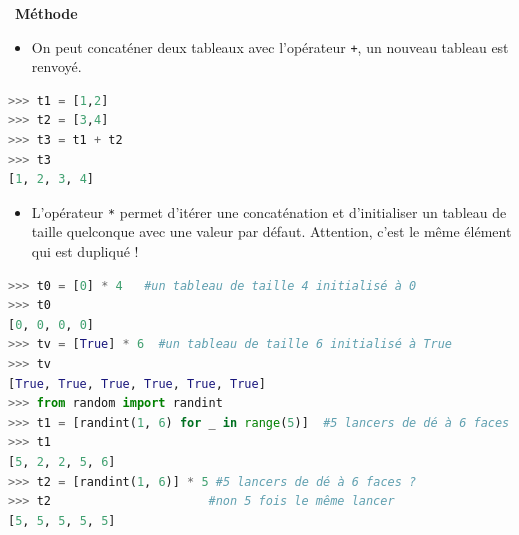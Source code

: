 \documentclass[
  11pt,
]{article}
\newcommand{\passthrough}[1]{#1}
\providecommand{\tightlist}{%
  \setlength{\itemsep}{0pt}\setlength{\parskip}{0pt}}
\newenvironment{methode}[1]
{\par \medskip    \noindent  
 \begin {bclogo}[arrondi =0.1,logo=\bcoutil, marge=4,noborder = true] {~\textbf{Méthode}   {\itshape #1} }  \par}
{
\end{bclogo}
 \par \bigskip }
\begin{document}
\begin{methode}{}

\begin{itemize}
\tightlist
\item
  On peut concaténer deux tableaux avec l'opérateur
  \passthrough{\lstinline!+!}, un nouveau tableau est renvoyé.
\end{itemize}

\begin{lstlisting}[language=Python]
>>> t1 = [1,2]
>>> t2 = [3,4]
>>> t3 = t1 + t2
>>> t3
[1, 2, 3, 4]
\end{lstlisting}

\begin{itemize}
\tightlist
\item
  L'opérateur \passthrough{\lstinline!*!} permet d'itérer une
  concaténation et d'initialiser un tableau de taille quelconque avec
  une valeur par défaut. Attention, c'est le même élément qui est
  dupliqué !
\end{itemize}

\begin{lstlisting}[language=Python]
>>> t0 = [0] * 4   #un tableau de taille 4 initialisé à 0
>>> t0
[0, 0, 0, 0]
>>> tv = [True] * 6  #un tableau de taille 6 initialisé à True
>>> tv
[True, True, True, True, True, True]
>>> from random import randint
>>> t1 = [randint(1, 6) for _ in range(5)]  #5 lancers de dé à 6 faces
>>> t1
[5, 2, 2, 5, 6]
>>> t2 = [randint(1, 6)] * 5 #5 lancers de dé à 6 faces ?
>>> t2                      #non 5 fois le même lancer
[5, 5, 5, 5, 5]
\end{lstlisting}

\end{methode}
\end{document}
